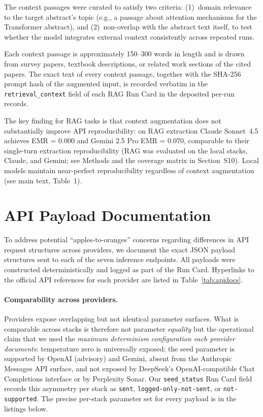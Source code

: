 \documentclass[11pt]{article}
\begin{document}
The context passages were curated to satisfy two criteria: (1)~domain relevance to the target abstract's topic (e.g., a passage about attention mechanisms for the Transformer abstract), and (2)~non-overlap with the abstract text itself, to test whether the model integrates external context consistently across repeated runs.

Each context passage is approximately 150--300 words in length and is drawn from survey papers, textbook descriptions, or related work sections of the cited papers. The exact text of every context passage, together with the SHA-256 prompt hash of the augmented input, is recorded verbatim in the \texttt{retrieval\_context} field of each RAG Run Card in the deposited per-run records.

The key finding for RAG tasks is that context augmentation does not substantially improve API reproducibility: on RAG extraction Claude Sonnet~4.5 achieves EMR = 0.000 and Gemini 2.5 Pro EMR = 0.070, comparable to their single-turn extraction reproducibility (RAG was evaluated on the local stacks, Claude, and Gemini; see Methods and the coverage matrix in Section~S10). Local models maintain near-perfect reproducibility regardless of context augmentation (see main text, Table~1).


\section{API Payload Documentation}
\label{sec:s4}

To address potential ``apples-to-oranges'' concerns regarding differences in API request structures across providers, we document the exact JSON payload structures sent to each of the seven inference endpoints. All payloads were constructed deterministically and logged as part of the Run Card. Hyperlinks to the official API references for each provider are listed in Table~\ref{tab:apidocs}.

\paragraph{Comparability across providers.}
Providers expose overlapping but not identical parameter surfaces. What is comparable across stacks is therefore not parameter \emph{equality} but the operational claim that we used the \emph{maximum determinism configuration each provider documents}: temperature zero is universally exposed; the seed parameter is supported by OpenAI (advisory) and Gemini, absent from the Anthropic Messages API surface, and not exposed by DeepSeek's OpenAI-compatible Chat Completions interface or by Perplexity Sonar. Our \texttt{seed\_status} Run Card field records this asymmetry per stack as \texttt{sent}, \texttt{logged-only-not-sent}, or \texttt{not-supported}. The precise per-stack parameter set for every payload is in the listings below.
\end{document}
